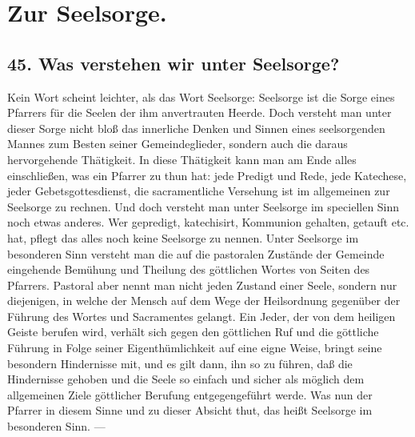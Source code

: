 \section*{Zur Seelsorge.}

\subsection*{45. Was verstehen wir unter Seelsorge?}

Kein Wort scheint leichter, als das Wort Seelsorge: Seelsorge ist die Sorge eines Pfarrers für die Seelen der ihm anvertrauten Heerde. Doch versteht man unter dieser
Sorge nicht bloß das innerliche Denken und Sinnen eines seelsorgenden Mannes zum Besten seiner Gemeindeglieder, sondern auch die daraus hervorgehende Thätigkeit. In diese Thätigkeit kann man am Ende alles einschließen, was ein Pfarrer zu thun hat: jede Predigt und Rede, jede Katechese, jeder Gebetsgottesdienst, die sacramentliche Versehung ist im allgemeinen zur Seelsorge zu rechnen. Und doch versteht man unter Seelsorge im speciellen Sinn noch etwas anderes. Wer gepredigt, katechisirt, Kommunion gehalten, getauft etc. hat, pflegt das alles noch keine Seelsorge zu nennen. Unter Seelsorge im besonderen Sinn versteht man die auf die pastoralen Zustände der Gemeinde eingehende Bemühung und Theilung des göttlichen Wortes von Seiten des Pfarrers. Pastoral aber nennt man nicht jeden Zustand einer Seele, sondern nur diejenigen, in welche der Mensch auf dem Wege der Heilsordnung gegenüber der Führung des Wortes und Sacramentes gelangt. Ein Jeder, der von dem heiligen Geiste berufen wird, verhält sich gegen den göttlichen Ruf und die göttliche Führung in Folge seiner Eigenthümlichkeit auf eine eigne Weise, bringt seine besondern Hindernisse mit, und es gilt dann, ihn so zu führen, daß die Hindernisse gehoben und die Seele so einfach und sicher als möglich dem allgemeinen Ziele göttlicher Berufung entgegengeführt werde. Was nun der Pfarrer in diesem Sinne und zu dieser Absicht thut, das heißt Seelsorge im besonderen Sinn. —

